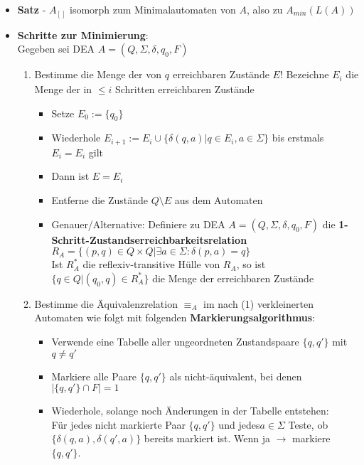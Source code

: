 \documentclass[12pt, a4paper]{article}
\begin{document}
\begin{itemize}
		\item \textbf{Satz} - $A_{[]}$ isomorph zum Minimalautomaten von $A$, also zu $A_{min}(L(A))$
		
		\item \textbf{Schritte zur Minimierung}:	\\	
		Gegeben sei DEA $A=(Q,\Sigma,\delta,q_{0},F)$
		\begin{enumerate}
			\item Bestimme die Menge der von $q_{}$ erreichbaren Zustände $E$! 
			\subitem Bezeichne $E_{i}$ die Menge der in $\leq i$ Schritten erreichbaren Zustände
			
			\begin{itemize}
				\item Setze $E_{0}:=\{q_{0}\}$
				\item Wiederhole $E_{i+1}:=E_{i}\cup\{\delta(q,a)|q\in E_{i},a\in\Sigma\}$ bis erstmals $E_{i}=E_{i}$ gilt
				
				\item Dann ist $E=E_{i}$
				
				\item Entferne die Zustände $Q\setminus E$ aus dem Automaten
				
				\item Genauer/Alternative: Definiere zu DEA $A=(Q,\Sigma,\delta,q_{0},F)$ die \textbf{1-Schritt-Zustandserreichbarkeitsrelation} $R_{A}=\{(p,q)\in Q\times Q|\exists a\in\Sigma:\delta(p,a)=q\}$\\
				
				Ist $R^{*}_{A}$ die reflexiv-transitive Hülle von $R_{A}$, so ist $\{q\in Q|(q_{0},q)\in R^{*}_{A}\}$ die Menge der erreichbaren Zustände
			\end{itemize}
		
			\item Bestimme die Äquivalenzrelation $\equiv_{A}$ im nach (1) verkleinerten Automaten wie folgt mit folgenden \textbf{Markierungsalgorithmus}:
			\begin{itemize}
				\item Verwende eine Tabelle aller ungeordneten Zustandspaare $\{q,q'\}$ mit $q\neq q'$
				
				\item Markiere alle Paare $\{q,q'\}$ als nicht-äquivalent, bei denen $|\{q,q'\}\cap F|=1$
				
				\item Wiederhole, solange noch Änderungen in der Tabelle entstehen:\\
				\subitem Für jedes nicht markierte Paar $\{q,q'\}$ und jedes$a\in\Sigma$ Teste, ob $\{\delta(q,a),\delta(q',a)\}$ bereits markiert ist. Wenn ja $\rightarrow$ markiere $\{q,q'\}$.
				

\end{itemize}
\end{enumerate}
\end{itemize}
\end{document}
